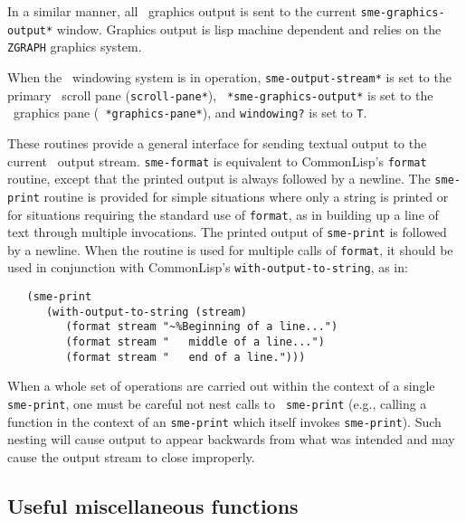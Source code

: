 In a similar manner, all \SME\ graphics output is sent to the current
{\tt *sme-graphics-output*} window. Graphics output is lisp machine
dependent and relies on the {\tt ZGRAPH} graphics system.

When the \SME\ windowing system is in operation, {\tt *sme-output-stream*}
is set to the primary \SME\ scroll pane ({\tt *scroll-pane*}), {\tt
*sme-graphics-output*} is set to the \SME\ graphics pane ({\tt
*graphics-pane*}), and {\tt windowing?} is set to {\tt T}.


These routines provide a general interface for sending textual output to the
current \SME\ output stream. {\tt sme-format} is equivalent to CommonLisp's
{\tt format} routine, except that the printed output is always followed by a
newline. The {\tt sme-print} routine is provided for simple situations where
only a string is printed or for situations requiring the standard use of
{\tt format}, as in building up a line of text through multiple invocations.
The printed output of {\tt sme-print} is followed by a newline. When the
routine is used for multiple calls of {\tt format}, it should be used in
conjunction with CommonLisp's {\tt with-output-to-string}, as in:

\begin{small}
\begin{verbatim}
   (sme-print
      (with-output-to-string (stream)
         (format stream "~%Beginning of a line...")
         (format stream "   middle of a line...")
         (format stream "   end of a line.")))
\end{verbatim}
\end{small}

When a whole set of operations are carried out within the context of a
single {\tt sme-print}, one must be careful not nest calls to {\tt
sme-print} (e.g., calling a function in the context of an {\tt sme-print}
which itself invokes {\tt sme-print}). Such nesting will cause output 
to appear backwards from what was intended and may cause the output stream
to close improperly.


\subsection{Useful miscellaneous functions}

